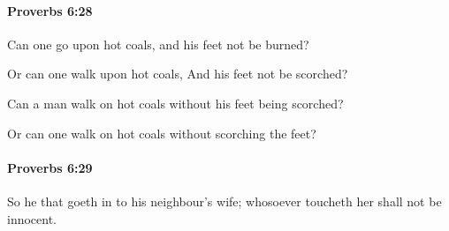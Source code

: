 		\paragraph{Proverbs 6:28} %
			\label{PROVERBS-6-28}

			Can one go upon hot coals, and his feet not be burned?

			\begin{versebox}
					\item[BHS] 
					\item[ASV] Or can one walk upon hot coals, And his feet not be scorched?
					\item[NIV] Can a man walk on hot coals without his feet being scorched?
					\item[NRSV] Or can one walk on hot coals without scorching the feet?
			\end{versebox}

		\paragraph{Proverbs 6:29} %
			\label{PROVERBS-6-29}

			So he that goeth in to his neighbour’s wife; whosoever toucheth her shall not be innocent.

